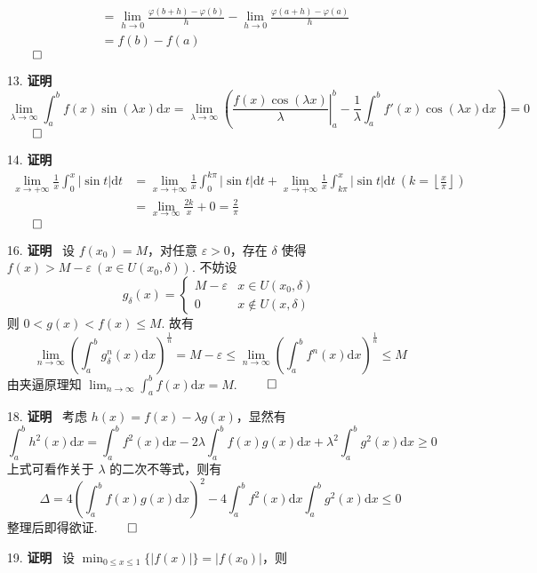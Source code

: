 \documentclass[11pt,oneside,fontset=fandol]{ctexbook} %
\begin{document}
\begin{enumerate}
\begin{align*}
        &= \lim_{h \to 0} \frac {\varphi(b+h) - \varphi(b)} h - \lim_{h \to 0} \frac {\varphi(a+h) - \varphi(a)} h \\
        &= f(b) - f(a)
    \end{align*}
    $\hfill\qed$
    \item[13.]
    \textbf{证明}
    \[
        \lim_{\lambda \to \infty} \int_a^b f(x) \sin(\lambda x) \mathrm dx = \lim_{\lambda \to \infty} \left( \left. \frac {f(x) \cos(\lambda x)} \lambda \right|_a^b - \frac 1 \lambda \int_a^b f'(x) \cos(\lambda x) \mathrm dx \right) = 0
    \]
    $\hfill\qed$
    \item[14.]
    \textbf{证明}
    \begin{align*}
        \lim_{x \to +\infty} \frac 1 x \int_0^{x} |\sin t| \mathrm dt &= \lim_{x \to +\infty} \frac 1 x \int_0^{k\pi} |\sin t| \mathrm dt + \lim_{x \to +\infty} \frac 1 x \int_{k\pi}^x |\sin t| \mathrm dt \ \left( k = \left\lfloor \frac x \pi \right\rfloor \right) \\
        &= \lim_{x \to \infty} \frac {2k} x + 0 = \frac 2 \pi
    \end{align*}
    $\hfill\qed$
    \item[16.]
    \textbf{证明} \ 设 $f(x_0) = M$，对任意 $\varepsilon > 0$，存在 $\delta$ 使得 $f(x) > M - \varepsilon \ \left(x \in U(x_0, \delta) \right)$. 不妨设
    \[
        g_\delta(x) =
        \begin{cases}
            M - \varepsilon & x \in U(x_0, \delta) \\
            0 & x \not\in U(x, \delta)
        \end{cases}
    \]
    则 $0 < g(x) < f(x) \leqslant M$. 故有
    \[
        \lim_{n \to \infty} \left( \int_a^b g_\delta^n(x) \mathrm dx \right)^{\frac 1 n} = M - \varepsilon \leqslant \lim_{n \to \infty} \left( \int_a^b f^n(x) \mathrm dx \right)^{\frac 1 n} \leqslant M
    \]
    由夹逼原理知 $\lim_{n \to \infty} \int_a^b f(x) \mathrm dx = M$.
    $\hfill\qed$
    \item[18.]
    \textbf{证明} \ 考虑 $h(x) = f(x) - \lambda g(x)$，显然有
    \[
        \int_a^b h^2(x) \mathrm dx = \int_a^b f^2(x) \mathrm dx - 2\lambda \int_a^b f(x)g(x) \mathrm dx + \lambda^2 \int_a^b g^2(x) \mathrm dx \geqslant 0
    \]
    上式可看作关于 $\lambda$ 的二次不等式，则有
    \[
        \Delta = 4 \left( \int_a^b f(x)g(x) \mathrm dx \right)^2 - 4 \int_a^b f^2(x) \mathrm dx \int_a^b g^2(x) \mathrm dx \leqslant 0
    \]
    整理后即得欲证.
    $\hfill\qed$
    \item[19.]
    \textbf{证明} \ 设 $\min_{0 \leqslant x \leqslant 1}\{ |f(x)| \} = |f(x_0)|$，则

\end{enumerate}
\end{document}
